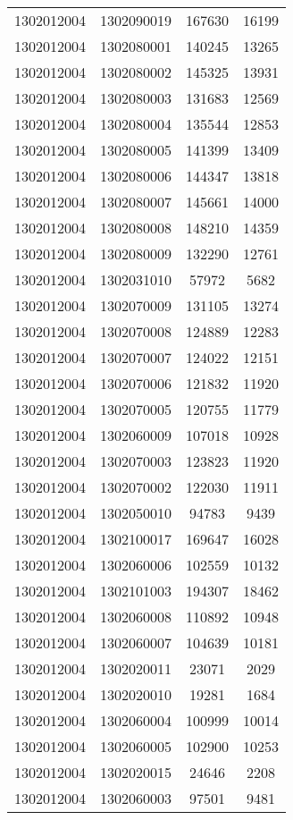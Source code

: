 \begin{longtable}[h]{llcc}
		1302012004 & 1302090019 & 167630 & 16199\\
		1302012004 & 1302080001 & 140245 & 13265\\
		1302012004 & 1302080002 & 145325 & 13931\\
		1302012004 & 1302080003 & 131683 & 12569\\
		1302012004 & 1302080004 & 135544 & 12853\\
		1302012004 & 1302080005 & 141399 & 13409\\
		1302012004 & 1302080006 & 144347 & 13818\\
		1302012004 & 1302080007 & 145661 & 14000\\
		1302012004 & 1302080008 & 148210 & 14359\\
		1302012004 & 1302080009 & 132290 & 12761\\
		1302012004 & 1302031010 & 57972 & 5682\\
		1302012004 & 1302070009 & 131105 & 13274\\
		1302012004 & 1302070008 & 124889 & 12283\\
		1302012004 & 1302070007 & 124022 & 12151\\
		1302012004 & 1302070006 & 121832 & 11920\\
		1302012004 & 1302070005 & 120755 & 11779\\
		1302012004 & 1302060009 & 107018 & 10928\\
		1302012004 & 1302070003 & 123823 & 11920\\
		1302012004 & 1302070002 & 122030 & 11911\\
		1302012004 & 1302050010 & 94783 & 9439\\
		1302012004 & 1302100017 & 169647 & 16028\\
		1302012004 & 1302060006 & 102559 & 10132\\
		1302012004 & 1302101003 & 194307 & 18462\\
		1302012004 & 1302060008 & 110892 & 10948\\
		1302012004 & 1302060007 & 104639 & 10181\\
		1302012004 & 1302020011 & 23071 & 2029\\
		1302012004 & 1302020010 & 19281 & 1684\\
		1302012004 & 1302060004 & 100999 & 10014\\
		1302012004 & 1302060005 & 102900 & 10253\\
		1302012004 & 1302020015 & 24646 & 2208\\
		1302012004 & 1302060003 & 97501 & 9481\\

\end{longtable}
